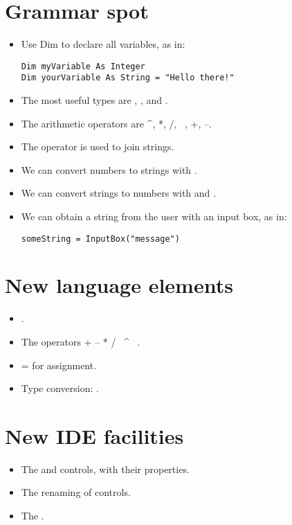 	\section{Grammar spot}
		\begin{itemize}
			\item Use Dim to declare all variables, as in:
				\begin{lstlisting}
Dim myVariable As Integer
Dim yourVariable As String = "Hello there!"
				\end{lstlisting}
			\item The most useful types are , , and .
			\item The arithmetic operators are \textasciicircum, *, /, \, , +, –.
			\item The \keyword{\&} operator is used to join strings.
			\item We can convert numbers to strings with .
			\item We can convert strings to numbers with  and .
			\item We can obtain a string from the user with an input box, as in:
				\begin{lstlisting}
someString = InputBox("message")
				\end{lstlisting}
		\end{itemize}

	\section{New language elements}
		\begin{itemize}
			\item {}.
			\item The operators + – * / \ \textasciicircum\  \keyword{\&}.
			\item = for assignment.
			\item Type conversion:   .
		\end{itemize}

	\section{New IDE facilities}
		\begin{itemize}
			\item The  and  controls, with their  properties.
			\item The renaming of controls.
			\item The .
		\end{itemize}

